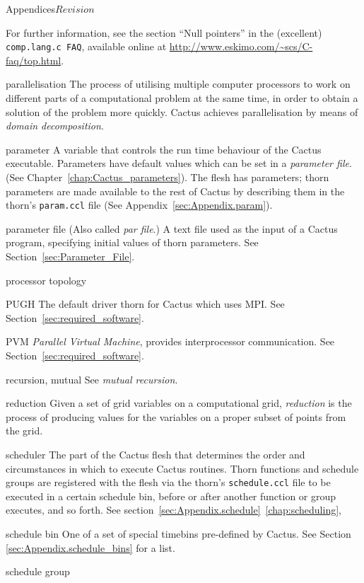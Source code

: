 \begin{cactuspart}{Appendices}{}{$Revision$}
\begin{Lentry}
  For further information, see the section ``Null pointers''
  in the (excellent) {\tt comp.lang.c FAQ}, available online at
  \url{http://www.eskimo.com/~scs/C-faq/top.html}.
\item[parallelisation]
  The process of utilising multiple computer processors to work on different
  parts of a computational problem at the same time, in order to obtain a
  solution of the problem more quickly.  Cactus achieves parallelisation
  by means of \textit{domain decomposition}.
\item[parameter]
  A variable that controls the run time behaviour of the Cactus executable.
  Parameters have default values which can be set in a
  \textit{parameter file}. (See Chapter~\ref{chap:Cactus_parameters}).
  The flesh has parameters; thorn parameters are made available to the rest
  of Cactus by describing them in the thorn's 
  {\tt param.ccl} file (See Appendix~\ref{sec:Appendix.param}).
\item[parameter file]
  (Also called \textit{par file}.) A text file used as the input of a
  Cactus program, specifying initial values of thorn parameters.
  See Section~\ref{sec:Parameter_File}.
\item[processor topology]
\item[PUGH]
  The default driver thorn for Cactus which uses MPI.
  See Section~\ref{sec:required_software}.
\item[PVM]
  \textit{Parallel Virtual Machine}, provides interprocessor communication.
  See Section~\ref{sec:required_software}.
\item[recursion, mutual]
  See \textit{mutual recursion}.
\item[reduction]
  Given a set of grid variables on a computational grid, \textit{reduction} 
  is the process of producing values for the variables on a proper subset of
  points from the grid.
\item[scheduler]
  The part of the Cactus flesh that determines the order and circumstances
  in which to execute Cactus routines.  Thorn functions and schedule groups 
  are registered with the flesh via the thorn's {\tt schedule.ccl} file to
  be executed in a certain schedule bin, before or after another function 
  or group executes, and so forth.
  See section~\ref{sec:Appendix.schedule}~\ref{chap:scheduling},
\item[schedule bin]
  One of a set of special timebins pre-defined by Cactus.
  See Section \ref{sec:Appendix.schedule_bins} for a list.
\item[schedule group]

\end{Lentry}
\end{cactuspart}
